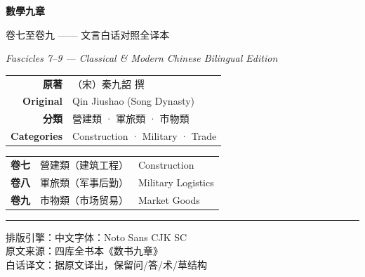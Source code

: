 \documentclass[11pt,a4paper]{article}
\begin{document}
\begin{titlepage}
\centering
\vspace*{1.5cm}

{\fontsize{26}{34}\selectfont\color{titlecolor}
\textbf{數學九章}
}

\vspace{1cm}

{\fontsize{18}{24}\selectfont\color{sectioncolor}
卷七至卷九 —— 文言白话对照全译本
}

\vspace{0.5cm}

{\large\color{sectioncolor}
\textit{Fascicles 7--9 — Classical & Modern Chinese Bilingual Edition}
}

\vspace{2cm}

{\large
\begin{tabular}{rl}
\textbf{原著} & （宋）秦九韶 撰 \\
\textbf{Original} & Qin Jiushao (Song Dynasty) \\
\textbf{分類} & 營建類 · 軍旅類 · 市物類 \\
\textbf{Categories} & Construction · Military · Trade \\
\end{tabular}
}

\vspace{1.5cm}


\vspace{2cm}

{\large
\begin{tabular}{lll}
\textbf{卷七} & 營建類（建筑工程）& Construction \\
\textbf{卷八} & 軍旅類（军事后勤）& Military Logistics \\
\textbf{卷九} & 市物類（市场贸易）& Market Goods \\
\end{tabular}
}

\vspace{1.5cm}

{\color{rulecolor}\rule{0.6\textwidth}{0.6pt}}

\vspace{0.5cm}

{\small\color{sectioncolor}
排版引擎：\XeLaTeX\quad 中文字体：Noto Sans CJK SC\\
原文来源：四库全书本《数书九章》\\
白话译文：据原文译出，保留问/答/术/草结构
}

\end{titlepage}
\end{document}
